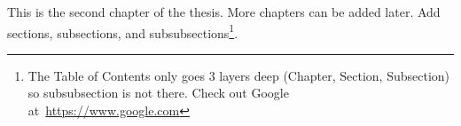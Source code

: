 This is the second chapter of the thesis. More chapters can be added later. Add sections, subsections, and subsubsections\footnote{The Table of Contents only goes 3 layers deep (Chapter, Section, Subsection) so subsubsection is not there. Check out Google at~\url{https://www.google.com}}.